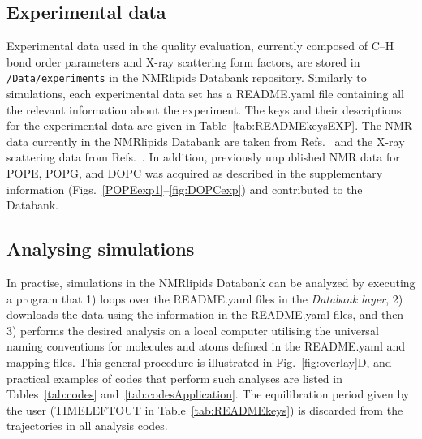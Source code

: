 \documentclass[fleqn,10pt]{wlscirep}
\begin{document}
\subsection{Experimental data}
Experimental data used in the quality evaluation, currently composed of C--H bond order parameters and X-ray scattering form factors, are stored in \texttt{/Data/experiments} in the NMRlipids Databank repository. Similarly to simulations, each experimental data set has a README.yaml file containing all the relevant information about the experiment. The keys and their descriptions for the experimental data are given in Table~\ref{tab:READMEkeysEXP}. The NMR data currently in the NMRlipids Databank are taken from Refs.~ and the X-ray scattering data from Refs.~. In addition, previously unpublished NMR data for POPE, POPG, and DOPC was acquired as described in the supplementary information (Figs.~\ref{POPEexp1}--\ref{fig:DOPCexp}) and contributed to the Databank. 


\subsection{Analysing simulations}
In practise, simulations in the NMRlipids Databank can be analyzed by executing a program that
1) loops over the README.yaml files in the {\it Databank layer},
2) downloads the data using the information in the README.yaml files, and then
3) performs the desired analysis on a local computer utilising the universal naming conventions for molecules and atoms defined in the README.yaml and mapping files.
This general procedure is illustrated in Fig.~\ref{fig:overlay}D, and practical examples of codes that perform such analyses are listed in Tables~\ref{tab:codes} and~\ref{tab:codesApplication}. The equilibration period given by the user (TIMELEFTOUT in Table~\ref{tab:READMEkeys}) is discarded from the trajectories in all analysis codes.
\end{document}
